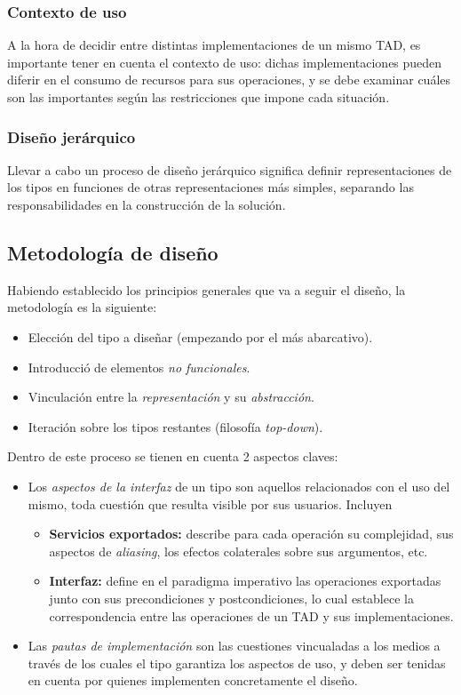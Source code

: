 \documentclass{article}
\begin{document}
\subsubsection{Contexto de uso}

A la hora de decidir entre distintas implementaciones de un mismo TAD, es importante tener en cuenta el contexto de uso: dichas implementaciones pueden diferir en el consumo de recursos para sus operaciones, y se debe examinar cuáles son las importantes según las restricciones que impone cada situación.

\subsubsection{Diseño jerárquico}

Llevar a cabo un proceso de diseño jerárquico significa definir representaciones de los tipos en funciones de otras representaciones más simples, separando las responsabilidades en la construcción de la solución.

\subsection{Metodología de diseño}

Habiendo establecido los principios generales que va a seguir el diseño, la metodología es la siguiente:
\begin{itemize}
    \item Elección del tipo a diseñar (empezando por el más abarcativo).
    \item Introducció de elementos \textit{no funcionales}.
    \item Vinculación entre la \textit{representación} y su \textit{abstracción}.
    \item Iteración sobre los tipos restantes (filosofía \textit{top-down}).
\end{itemize}

Dentro de este proceso se tienen en cuenta 2 aspectos claves:
\begin{itemize}
    \item Los \textit{aspectos de la interfaz} de un tipo son aquellos relacionados con el uso del mismo, toda cuestión que resulta visible por sus usuarios. Incluyen
          \begin{itemize}
              \item \textbf{Servicios exportados:} describe para cada operación su complejidad, sus aspectos de \textit{aliasing}, los efectos colaterales sobre sus argumentos, etc.
              \item \textbf{Interfaz:} define en el paradigma imperativo las operaciones exportadas junto con sus precondiciones y postcondiciones, lo cual establece la correspondencia entre las operaciones de un TAD y sus implementaciones.
          \end{itemize}
    \item Las \textit{pautas de implementación} son las cuestiones vincualadas a los medios a través de los cuales el tipo garantiza los aspectos de uso, y deben ser tenidas en cuenta por quienes implementen concretamente el diseño.
\end{itemize}
\end{document}
